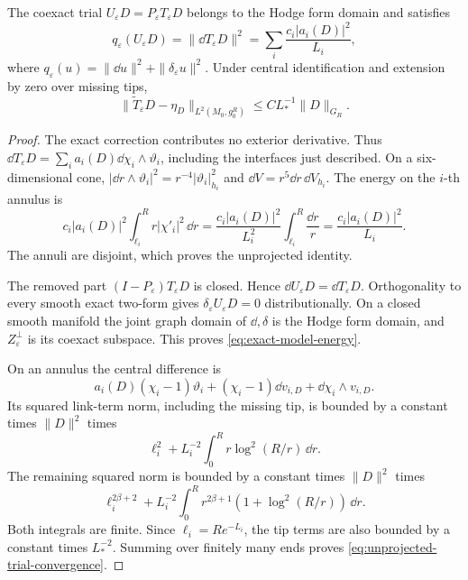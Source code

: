 \begin{lemma}\label{lem:exact-trial-energy}
The coexact trial $U_\varepsilon D=P_\varepsilon T_\varepsilon D$
belongs to the Hodge form domain and satisfies
\begin{equation}\label{eq:exact-model-energy}
 q_\varepsilon(U_\varepsilon D)
 =\|\dd T_\varepsilon D\|^2
 =\sum_i\frac{c_i|a_i(D)|^2}{L_i},
\end{equation}
where $q_\varepsilon(u)=\|\dd u\|^2+\|\delta_\varepsilon u\|^2$.
Under central identification and extension by zero over missing tips,
\begin{equation}\label{eq:unprojected-trial-convergence}
 \|\widetilde T_\varepsilon D-\eta_D\|_{L^2(M_0,g_0^R)}
       \le C L_*^{-1}\|D\|_{G_R}.
\end{equation}
\end{lemma}
\begin{proof}
The exact correction contributes no exterior derivative. Thus
$\dd T_\varepsilon D=\sum_i a_i(D)\dd\chi_i\wedge\vartheta_i$,
including the interfaces just described. On a six-dimensional cone,
$|\dd r\wedge\vartheta_i|^2=r^{-4}|\vartheta_i|_{h_i}^2$ and
$\dd V=r^5\dd r\,\dd V_{h_i}$. The energy on the $i$-th annulus is
\[
 c_i|a_i(D)|^2\int_{\ell_i}^R r|\chi'_i|^2\,\dd r
   =\frac{c_i|a_i(D)|^2}{L_i^2}
          \int_{\ell_i}^R\frac{\dd r}{r}
   =\frac{c_i|a_i(D)|^2}{L_i}.
\]
The annuli are disjoint, which proves the unprojected identity.

The removed part $(I-P_\varepsilon)T_\varepsilon D$ is closed.
Hence $\dd U_\varepsilon D=\dd T_\varepsilon D$. Orthogonality
to every smooth exact two-form gives
$\delta_\varepsilon U_\varepsilon D=0$ distributionally. On a
closed smooth manifold the joint graph domain of $\dd,\delta$ is
the Hodge form domain, and $Z_\varepsilon^\perp$ is its coexact
subspace. This proves \eqref{eq:exact-model-energy}.

On an annulus the central difference is
\[
 a_i(D)(\chi_i-1)\vartheta_i+
       (\chi_i-1)\dd v_{i,D}+\dd\chi_i\wedge v_{i,D}.
\]
Its squared link-term norm, including the missing tip, is bounded by
a constant times $\|D\|^2$ times
\[
 \ell_i^2+L_i^{-2}\int_0^R r\log^2(R/r)\,\dd r.
\]
The remaining squared norm is bounded by a constant times $\|D\|^2$
times
\[
 \ell_i^{2\beta+2}
   +L_i^{-2}\int_0^R r^{2\beta+1}
                     (1+\log^2(R/r))\,\dd r.
\]
Both integrals are finite. Since $\ell_i=Re^{-L_i}$, the tip terms
are also bounded by a constant times $L_*^{-2}$. Summing over
finitely many ends proves \eqref{eq:unprojected-trial-convergence}.
\end{proof}

